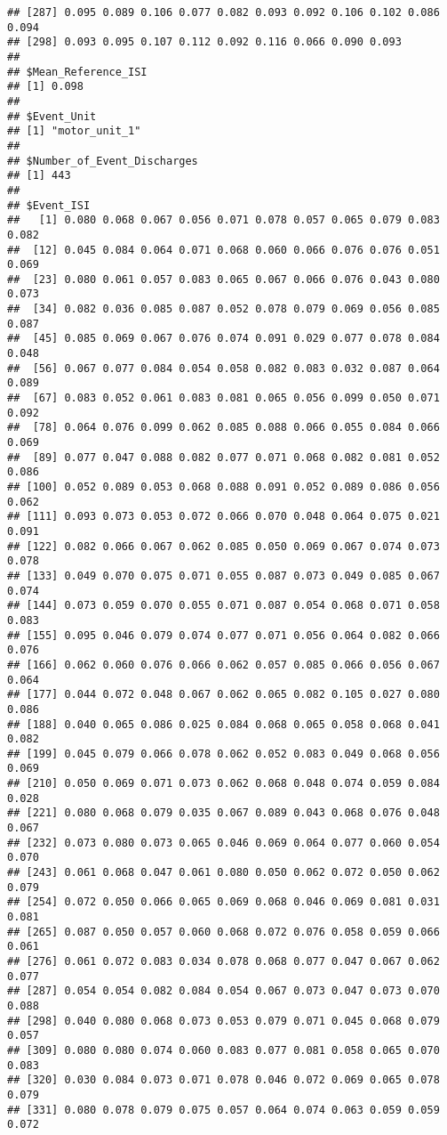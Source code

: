 \documentclass[]{article}
\begin{document}
\begin{verbatim}
## [287] 0.095 0.089 0.106 0.077 0.082 0.093 0.092 0.106 0.102 0.086 0.094
## [298] 0.093 0.095 0.107 0.112 0.092 0.116 0.066 0.090 0.093
## 
## $Mean_Reference_ISI
## [1] 0.098
## 
## $Event_Unit
## [1] "motor_unit_1"
## 
## $Number_of_Event_Discharges
## [1] 443
## 
## $Event_ISI
##   [1] 0.080 0.068 0.067 0.056 0.071 0.078 0.057 0.065 0.079 0.083 0.082
##  [12] 0.045 0.084 0.064 0.071 0.068 0.060 0.066 0.076 0.076 0.051 0.069
##  [23] 0.080 0.061 0.057 0.083 0.065 0.067 0.066 0.076 0.043 0.080 0.073
##  [34] 0.082 0.036 0.085 0.087 0.052 0.078 0.079 0.069 0.056 0.085 0.087
##  [45] 0.085 0.069 0.067 0.076 0.074 0.091 0.029 0.077 0.078 0.084 0.048
##  [56] 0.067 0.077 0.084 0.054 0.058 0.082 0.083 0.032 0.087 0.064 0.089
##  [67] 0.083 0.052 0.061 0.083 0.081 0.065 0.056 0.099 0.050 0.071 0.092
##  [78] 0.064 0.076 0.099 0.062 0.085 0.088 0.066 0.055 0.084 0.066 0.069
##  [89] 0.077 0.047 0.088 0.082 0.077 0.071 0.068 0.082 0.081 0.052 0.086
## [100] 0.052 0.089 0.053 0.068 0.088 0.091 0.052 0.089 0.086 0.056 0.062
## [111] 0.093 0.073 0.053 0.072 0.066 0.070 0.048 0.064 0.075 0.021 0.091
## [122] 0.082 0.066 0.067 0.062 0.085 0.050 0.069 0.067 0.074 0.073 0.078
## [133] 0.049 0.070 0.075 0.071 0.055 0.087 0.073 0.049 0.085 0.067 0.074
## [144] 0.073 0.059 0.070 0.055 0.071 0.087 0.054 0.068 0.071 0.058 0.083
## [155] 0.095 0.046 0.079 0.074 0.077 0.071 0.056 0.064 0.082 0.066 0.076
## [166] 0.062 0.060 0.076 0.066 0.062 0.057 0.085 0.066 0.056 0.067 0.064
## [177] 0.044 0.072 0.048 0.067 0.062 0.065 0.082 0.105 0.027 0.080 0.086
## [188] 0.040 0.065 0.086 0.025 0.084 0.068 0.065 0.058 0.068 0.041 0.082
## [199] 0.045 0.079 0.066 0.078 0.062 0.052 0.083 0.049 0.068 0.056 0.069
## [210] 0.050 0.069 0.071 0.073 0.062 0.068 0.048 0.074 0.059 0.084 0.028
## [221] 0.080 0.068 0.079 0.035 0.067 0.089 0.043 0.068 0.076 0.048 0.067
## [232] 0.073 0.080 0.073 0.065 0.046 0.069 0.064 0.077 0.060 0.054 0.070
## [243] 0.061 0.068 0.047 0.061 0.080 0.050 0.062 0.072 0.050 0.062 0.079
## [254] 0.072 0.050 0.066 0.065 0.069 0.068 0.046 0.069 0.081 0.031 0.081
## [265] 0.087 0.050 0.057 0.060 0.068 0.072 0.076 0.058 0.059 0.066 0.061
## [276] 0.061 0.072 0.083 0.034 0.078 0.068 0.077 0.047 0.067 0.062 0.077
## [287] 0.054 0.054 0.082 0.084 0.054 0.067 0.073 0.047 0.073 0.070 0.088
## [298] 0.040 0.080 0.068 0.073 0.053 0.079 0.071 0.045 0.068 0.079 0.057
## [309] 0.080 0.080 0.074 0.060 0.083 0.077 0.081 0.058 0.065 0.070 0.083
## [320] 0.030 0.084 0.073 0.071 0.078 0.046 0.072 0.069 0.065 0.078 0.079
## [331] 0.080 0.078 0.079 0.075 0.057 0.064 0.074 0.063 0.059 0.059 0.072

\end{verbatim}
\end{document}
